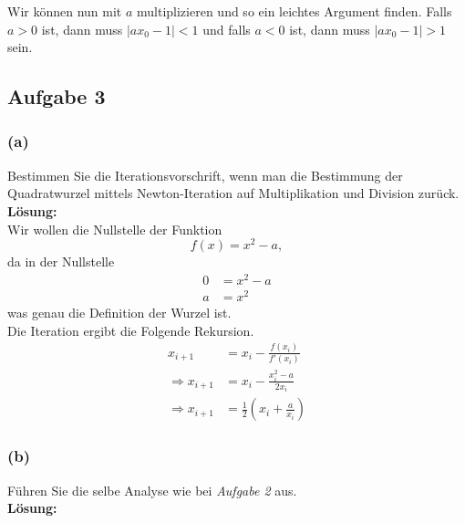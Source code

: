 \documentclass[11pt,a4paper,ngerman]{article}
\begin{document}
Wir können nun mit $a$ multiplizieren und so ein leichtes Argument finden. Falls
$a>0$ ist, dann muss $\left| ax_0 - 1 \right| < 1$ und falls $a<0$ ist, dann muss
$\left| ax_0 - 1\right| > 1$ sein.

\subsection*{Aufgabe 3}

\subsubsection*{(a)}

Bestimmen Sie die Iterationsvorschrift, wenn man die Bestimmung der Quadratwurzel mittels Newton-Iteration auf Multiplikation
und Division zurück.\\

\textbf{Lösung:}\\

Wir wollen die Nullstelle der Funktion
\begin{equation}
    f(x) = x^2 - a,
\end{equation}
da in der Nullstelle
\begin{equation*}\begin{split}
    0 &= x^2 - a\\
    a &= x^2
\end{split}\end{equation*}
was genau die Definition der Wurzel ist.\\

Die Iteration ergibt die Folgende Rekursion.
\begin{equation}\begin{split}\label{ha:ueb4:quadit}
    x_{i+1} &= x_i - \frac{f(x_i)}{f'(x_i)}\\
    \Rightarrow x_{i+1} &= x_i - \frac{x_i^2 - a}{2x_i}\\
    \Rightarrow x_{i+1} &= \frac{1}{2} (x_i + \frac{a}{x_i})
\end{split}\end{equation}

\subsubsection*{(b)}

Führen Sie die selbe Analyse wie bei \emph{Aufgabe 2} aus.\\

\textbf{Lösung:}\\
\end{document}
